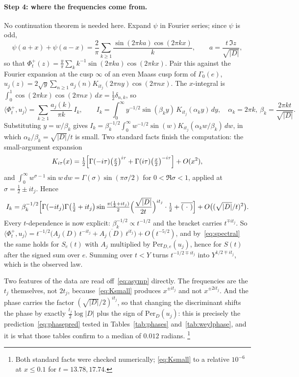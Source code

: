 \documentclass[11pt,a4paper]{article}
\theoremstyle{remark}\newtheorem{remark}[theorem]{Remark}
\begin{document}
\paragraph{Step 4: where the frequencies come from.} No continuation theorem is needed here. Expand $\psi$ in
Fourier series; since $\psi$ is odd,
\[
\psi(a+x)+\psi(a-x)=\frac2\pi\sum_{k\ge1}\frac{\sin(2\pi ka)\cos(2\pi kx)}{k},
\qquad a=\frac{t\,\Im z}{\sqrt{|D|}},
\]
so that $\Phi^+_t(z)=\frac y\pi\sum_k k^{-1}\sin(2\pi ka)\cos(2\pi kx)$. Pair this against the Fourier expansion at
the cusp $\infty$ of an even Maass cusp form of $\Gamma_0(e)$, $u_j(z)=2\sqrt y\sum_{n\ge1}a_j(n)K_{it_j}(2\pi ny)\cos(2\pi nx)$.
The $x$-integral is $\int_0^1\cos(2\pi kx)\cos(2\pi nx)\,dx=\tfrac12\delta_{n,k}$, so
\begin{equation}\label{eq:innerprod}
\langle\Phi^+_t,u_j\rangle=\sum_{k\ge1}\frac{a_j(k)}{\pi k}\,I_k,\qquad
I_k=\int_0^\infty y^{-1/2}\sin(\beta_ky)\,K_{it_j}(\alpha_ky)\,dy,\quad \alpha_k=2\pi k,\ \beta_k=\frac{2\pi kt}{\sqrt{|D|}} .
\end{equation}
Substituting $y=w/\beta_k$ gives $I_k=\beta_k^{-1/2}\int_0^\infty w^{-1/2}\sin(w)K_{it_j}(\alpha_kw/\beta_k)\,dw$,
in which $\alpha_k/\beta_k=\sqrt{|D|}/t$ is small. Two standard facts finish the computation: the small-argument
expansion
\begin{equation}\label{eq:Ksmall}
K_{i\tau}(x)=\tfrac12\Bigl[\Gamma(-i\tau)\bigl(\tfrac x2\bigr)^{i\tau}+\Gamma(i\tau)\bigl(\tfrac x2\bigr)^{-i\tau}\Bigr]+O(x^2),
\end{equation}
and $\int_0^\infty w^{\sigma-1}\sin w\,dw=\Gamma(\sigma)\sin(\pi\sigma/2)$ for $0<\Re\sigma<1$, applied at
$\sigma=\tfrac12\pm it_j$. Hence
\begin{equation}\label{eq:asymp}
I_k=\beta_k^{-1/2}\Bigl[\Gamma(-it_j)\Gamma\bigl(\tfrac12+it_j\bigr)\sin\tfrac{\pi(\frac12+it_j)}2\Bigl(\frac{\sqrt{|D|}}{2t}\Bigr)^{it_j}\cdot\tfrac12+\overline{(\ \cdot\ )}\Bigr]+O\bigl((\sqrt{|D|}/t)^{2}\bigr).
\end{equation}
Every $t$-dependence is now explicit: $\beta_k^{-1/2}\propto t^{-1/2}$ and the bracket carries $t^{\mp it_j}$. So
$\langle\Phi^+_t,u_j\rangle=t^{-1/2}\bigl(A_j(D)\,t^{-it_j}+\overline{A_j(D)}\,t^{it_j}\bigr)+O(t^{-5/2})$, and
by~\eqref{eq:spectral} the same holds for $S_e(t)$ with $A_j$ multiplied by $\mathrm{Per}_{D,e}(u_j)$, hence for
$S(t)$ after the signed sum over $e$. Summing over
$t<Y$ turns $t^{-1/2\mp it_j}$ into $Y^{1/2\mp it_j}$, which is the observed law.

Two features of the data are read off~\eqref{eq:asymp} directly. The frequencies are the $t_j$ themselves, not
$2t_j$, because~\eqref{eq:Ksmall} produces $x^{\pm it_j}$ and not $x^{\pm2it_j}$. And the phase carries the factor
$(\sqrt{|D|}/2)^{it_j}$, so that changing the discriminant shifts the phase by exactly
$\tfrac{t_j}2\log|D|$ plus the sign of $\mathrm{Per}_D(u_j)$: this is precisely the prediction~\eqref{eq:phasepred}
tested in Tables~\ref{tab:phases} and~\ref{tab:weylphase}, and it is what those tables confirm to a median of
$0.012$ radians. \footnote{Both standard facts were checked numerically; \eqref{eq:Ksmall} to a relative $10^{-6}$ at
$x\le0.1$ for $t=13.78,17.74$.}
\end{document}
